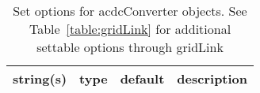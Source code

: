 \begin{table}[ht]
\centering
\begin{tabular}{p{5cm} c c p{7cm}}
\hline
string(s) & type & default & description \\
\hline
\hline
\end{tabular}
\caption{Set options for acdcConverter objects. See Table~\ref{table:gridLink} for additional settable options through gridLink}
\label{table:acdcConverter}
\end{table}
